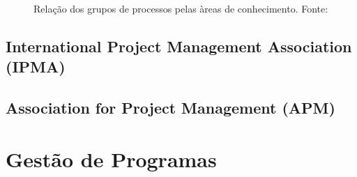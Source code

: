     \begin{figure}[!h]
      \centering
      \caption{Relação dos grupos de processos pelas àreas de conhecimento. Fonte: \cite{pmiguide2013}}
      \label{processos_areas_pmbok}
    \end{figure}

  \subsection{International Project Management Association (IPMA)}
  \subsection{Association for Project Management (APM)}

\section{Gestão de Programas}


